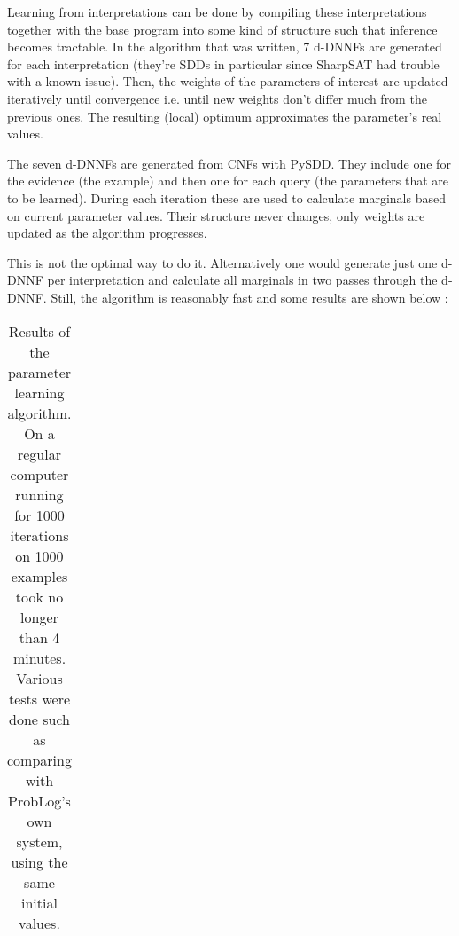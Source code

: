

Learning from interpretations can be done by compiling these interpretations together with the base program into some kind of structure such that inference becomes tractable. In the algorithm that was written, 7 d-DNNFs are generated for each interpretation (they're SDDs in particular since SharpSAT had trouble with a known issue). Then, the weights of the parameters of interest are updated iteratively until convergence i.e. until new weights don't differ much from the previous ones. The resulting (local) optimum approximates the parameter's real values.\\

\par\noindent The seven d-DNNFs are generated from CNFs with PySDD. They include one for the evidence (the example) and then one for each query (the parameters that are to be learned). During each iteration these are used to calculate marginals based on current parameter values. Their structure never changes, only weights are updated as the algorithm progresses.\\

\par\noindent This is not the optimal way to do it. Alternatively one would generate just one d-DNNF per interpretation and calculate all marginals in two passes through the d-DNNF. Still, the algorithm is reasonably fast and some results are shown below :

\begin{table}[h]
\centering
\begin{tabular}{ccc}
& &\\\hline
\end{tabular}
\caption{Results of the parameter learning algorithm. On a regular computer running for 1000 iterations on 1000 examples took no longer than 4 minutes. Various tests were done such as comparing with ProbLog's own system, using the same initial values.}
\label{plres}
\end{table}